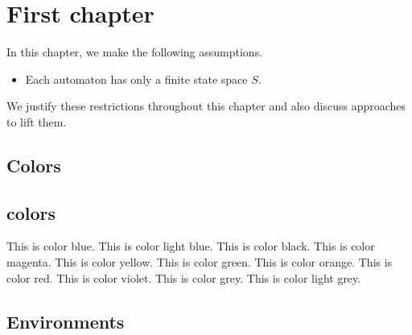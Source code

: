 \chapter{First chapter}
\label{chap:first_chapter}

\begin{assumptionbox}
    In this chapter, we make the following assumptions.
    \begin{itemize}
        \item Each automaton has only a finite state space $S$.
    \end{itemize}
    We justify these restrictions throughout this chapter and also discuss approaches to lift them.
\end{assumptionbox}


\section{Colors}
\section{colors}
\textcolor{CSblue}{This is color blue.}
\textcolor{CSlightblue}{This is color light blue.}
\textcolor{CSblack}{This is color black.}
\textcolor{CSmagenta}{This is color magenta.}
\textcolor{CSyellow}{This is color yellow.}
\textcolor{CSgreen}{This is color green.}
\textcolor{CSorange}{This is color orange.}
\textcolor{CSred}{This is color red.}
\textcolor{CSviolet}{This is color violet.}
\textcolor{CSgrey}{This is color grey.}
\textcolor{CSlightgrey}{This is color light grey.}


\section{Environments}

\newcommand{\testMath}{
Let $f$ be analytic in the region $G$ except for the isolated 
singularities $a_1,a_2,\dots,a_m$. If $\gamma$ is a closed 
rectifiable curve in $G$ which does not pass through any of the 
points $a_k$ and if $\gamma\approx 0$ in $G$, then
\[
  \frac{1}{2\pi i}\int_\gamma\! f = \sum_{k=1}^m 
  n(\gamma;a_k)Res(f;a_k)\,.
\]
}

